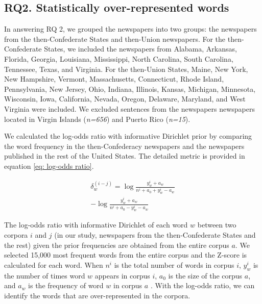 \documentclass[11pt]{article}
\begin{document}
\subsection{RQ2. Statistically over-represented words} \label{sec:method_rq2_overrepresented_words}
In answering RQ 2, we grouped the newspapers into two groups: the newspapers from the then-Confederate States and then-Union newspapers. 
For the then-Confederate States, we included the newspapers from Alabama, Arkansas, Florida, Georgia, Louisiana, Mississippi, 
North Carolina, South Carolina, Tennessee, Texas, and Virginia.
For the then-Union States, Maine, New York, New Hampshire, Vermont, Massachusetts, Connecticut, Rhode Island,
Pennsylvania, New Jersey, Ohio, Indiana, Illinois, Kansas, Michigan, Minnesota, Wisconsin, Iowa, California, Nevada, Oregon, Delaware, Maryland,
and West Virginia were included.
We excluded sentences from the newspapers newspapers located in Virgin Islands (\textit{n=656}) and Puerto Rico (\textit{n=15}).

We calculated the log-odds ratio with informative Dirichlet prior \cite{monroe2008fightin} 
by comparing the word frequency in the then-Confederacy newspapers 
and the newspapers published in the rest of the United States. 
The detailed metric is provided in equation \ref{eq: log-odds ratio}.

\begin{equation}
\begin{aligned}
  \delta_{w}^{(i-j)} = \log \frac{y_{w}^{i}+a_{w}}{n^{i}+a_{0}+y_{w}^{i}-a_{w}} \\
  - \log \frac{y_{w}^{i}+a_{w}}{n^{i}+a_{0}-y_{w}^{i}-a_{w}}
\end{aligned}
\label{eq: log-odds ratio}
\end{equation}

The log-odds ratio with informative Dirichlet of each word 
$w$ between two corpora $i$ and $j$ (in our study, newspapers from the
then-Confederate States and the rest) given the prior frequencies are obtained from the entire 
corpus $a$. We selected 15,000 most frequent words from the entire corpus and the Z-score is calculated for each word.
When $n^{i}$ is the total number of words in corpus $i$,
$y_{w}^{i}$ is the number of times word $w$ appears in corpus $i$,
$a_{0}$ is the size of the corpus $a$, and
$a_{w}$ is the frequency of word $w$ in corpus $a$ \citep{kwak2020systematic}.
With the log-odds ratio, we can identify the words that are over-represented 
in the corpora.
\end{document}

